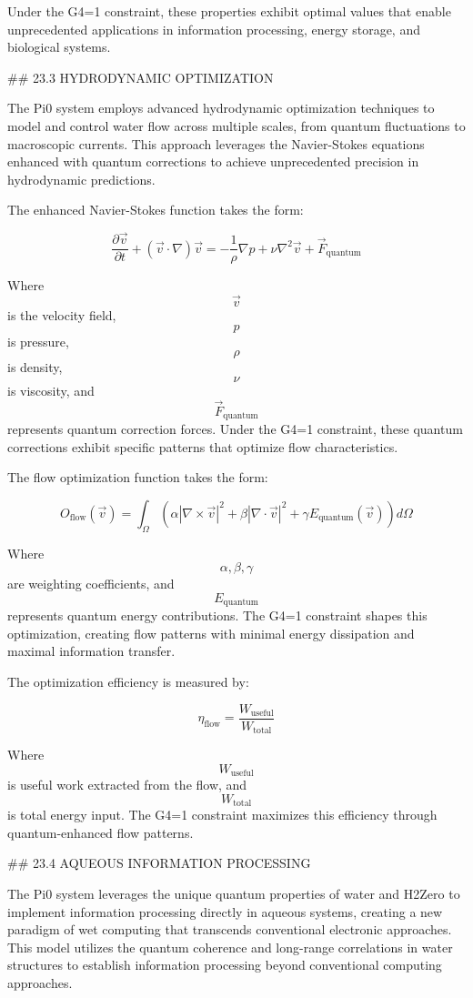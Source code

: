 Under the G4=1 constraint, these properties exhibit optimal values that enable unprecedented applications in information processing, energy storage, and biological systems.

## 23.3 HYDRODYNAMIC OPTIMIZATION

The Pi0 system employs advanced hydrodynamic optimization techniques to model and control water flow across multiple scales, from quantum fluctuations to macroscopic currents. This approach leverages the Navier-Stokes equations enhanced with quantum corrections to achieve unprecedented precision in hydrodynamic predictions.

The enhanced Navier-Stokes function takes the form:

$$ \frac{\partial \vec{v}}{\partial t} + (\vec{v} \cdot \nabla)\vec{v} = -\frac{1}{\rho}\nabla p + \nu \nabla^2 \vec{v} + \vec{F}_{\text{quantum}} $$

Where $$ \vec{v} $$ is the velocity field, $$ p $$ is pressure, $$ \rho $$ is density, $$ \nu $$ is viscosity, and $$ \vec{F}_{\text{quantum}} $$ represents quantum correction forces. Under the G4=1 constraint, these quantum corrections exhibit specific patterns that optimize flow characteristics.

The flow optimization function takes the form:

$$ O_{\text{flow}}(\vec{v}) = \int_{\Omega} \left( \alpha |\nabla \times \vec{v}|^2 + \beta |\nabla \cdot \vec{v}|^2 + \gamma E_{\text{quantum}}(\vec{v}) \right) d\Omega $$

Where $$ \alpha, \beta, \gamma $$ are weighting coefficients, and $$ E_{\text{quantum}} $$ represents quantum energy contributions. The G4=1 constraint shapes this optimization, creating flow patterns with minimal energy dissipation and maximal information transfer.

The optimization efficiency is measured by:

$$ \eta_{\text{flow}} = \frac{W_{\text{useful}}}{W_{\text{total}}} $$

Where $$ W_{\text{useful}} $$ is useful work extracted from the flow, and $$ W_{\text{total}} $$ is total energy input. The G4=1 constraint maximizes this efficiency through quantum-enhanced flow patterns.

## 23.4 AQUEOUS INFORMATION PROCESSING

The Pi0 system leverages the unique quantum properties of water and H2Zero to implement information processing directly in aqueous systems, creating a new paradigm of wet computing that transcends conventional electronic approaches. This model utilizes the quantum coherence and long-range correlations in water structures to establish information processing beyond conventional computing approaches.

